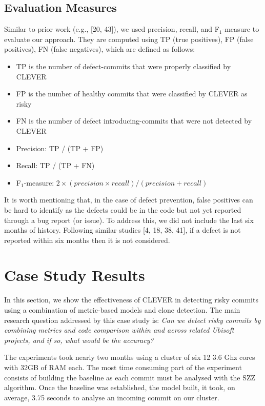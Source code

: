 \documentclass[sigconf]{acmart}
\providecommand{\tightlist}{%
  \setlength{\itemsep}{0pt}\setlength{\parskip}{0pt}}
\begin{document}
\subsection{Evaluation Measures}\label{evaluation-measures}

Similar to prior work (e.g., [20, 43]), we used precision, recall,
and F\(_1\)-measure to evaluate our approach. They are computed using TP
(true positives), FP (false positives), FN (false negatives), which are
defined as follows:

\begin{itemize}
\tightlist
\item
  TP is the number of defect-commits that were properly classified by
  CLEVER
\item
  FP is the number of healthy commits that were classified by CLEVER as
  risky
\item
  FN is the number of defect introducing-commits that were not detected
  by CLEVER
\item
  Precision: TP / (TP + FP)
\item
  Recall: TP / (TP + FN)
\item
  F\(_1\)-measure:
  \(2 \times (precision \times recall)/(precision+recall)\)
\end{itemize}

It is worth mentioning that, in the case of defect prevention, false
positives can be hard to identify as the defects could be in the code
but not yet reported through a bug report (or issue). To address this,
we did not include the last six months of history. Following similar
studies [4, 18, 38, 41], if a defect is not reported within six
months then it is not considered.

\section{Case Study Results}\label{sec:result}

In this section, we show the effectiveness of CLEVER in detecting risky
commits using a combination of metric-based models and clone detection.
The main research question addressed by this case study is: \emph{Can we
detect risky commits by combining metrics and code comparison within and
across related Ubisoft projects, and if so, what would be the accuracy?}

The experiments took nearly two months using a cluster of six 12 3.6 Ghz
cores with 32GB of RAM each. The most time consuming part of the
experiment consists of building the baseline as each commit must be
analysed with the SZZ algorithm. Once the baseline was established, the
model built, it took, on average, 3.75 seconds to analyse an incoming
commit on our cluster.
\end{document}
